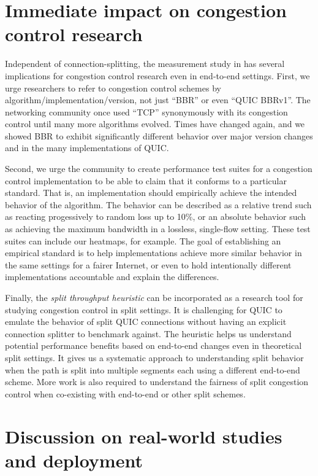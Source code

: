 \section{Immediate impact on congestion control research}
\label{sec:conclusion:congestion}

Independent of connection-splitting, the measurement study in
 has several implications for congestion control research
even in end-to-end settings. First, we urge researchers to refer
to congestion control schemes by algorithm/implementation/version, not just
``BBR'' or even ``QUIC BBRv1''. The networking community once used ``TCP''
synonymously with its congestion control until many more algorithms evolved.
Times have changed again, and we showed BBR to exhibit significantly different
behavior over major version changes and in the many implementations of QUIC.

Second, we urge the community to create performance test suites for a congestion
control implementation to be able to claim that it conforms to a particular
standard. That is, an implementation should empirically achieve the intended
behavior of the algorithm. The behavior can be described as a relative trend
such as reacting progessively to random loss up to 10\%, or an absolute
behavior such as achieving the maximum bandwidth in a lossless, single-flow
setting. These test suites can include our heatmaps, for example. The goal of
establishing an empirical standard is to help implementations achieve more
similar behavior in the same settings for a fairer Internet, or even to hold
intentionally different implementations accountable and explain the differences.

Finally, the \textit{split throughput heuristic} can be incorporated as a
research tool for studying congestion control in split settings. It is
challenging for QUIC to emulate the behavior of split QUIC connections without
having an explicit connection splitter to benchmark against. The heuristic
helps us understand potential performance benefits based on end-to-end changes
even in theoretical split settings. It gives us a systematic approach to
understanding split behavior when the path is split into multiple segments each
using a different end-to-end scheme. More work is also required to understand
the fairness of split congestion control when co-existing with end-to-end or
other split schemes.

\section{Discussion on real-world studies and deployment}
\label{sec:conclusion:real-world}


